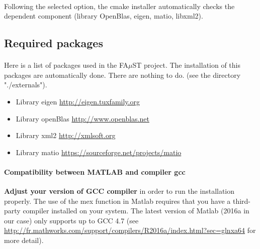 \paragraph{}Following the selected option, the cmake installer automatically checks the dependent component (library OpenBlas, eigen, matio, libxml2).  








\subsection{Required packages}\label{sec:RequiredPackages}

\paragraph{}Here is a list of packages used in the FA$\mu$ST project. The installation of this packages are automatically done. There are nothing to do. (see the directory "./externals").
\begin{itemize}
\item Library eigen \url{http://eigen.tuxfamily.org}
\item Library openBlas \url{http://www.openblas.net}
\item Library xml2 \url{http://xmlsoft.org}
\item Library matio \url{https://sourceforge.net/projects/matio}
\end{itemize}

\paragraph{Compatibility between MATLAB and compiler gcc} \textbf{Adjust your version of GCC compiler} in order to run the installation properly. The use of the mex function in Matlab requires that you have a third-party compiler installed on your system. The latest version of Matlab (2016a in our case) only supports up to GCC 4.7 (see \url{http://fr.mathworks.com/support/compilers/R2016a/index.html?sec=glnxa64} for more detail).
